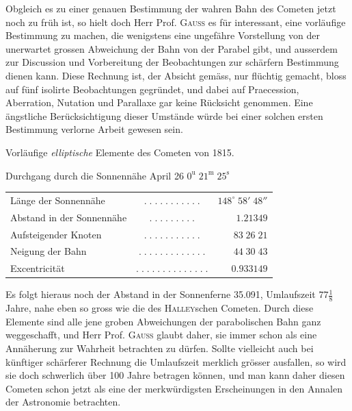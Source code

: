 \par\indent Obgleich es zu einer genauen Bestimmung der wahren Bahn des Cometen jetzt noch zu früh ist, so
hielt doch Herr Prof. \textsc{Gauss} es für interessant, eine vorläufige Bestimmung zu machen, die
wenigstens eine ungefähre Vorstellung von der unerwartet grossen Abweichung der Bahn von der
Parabel gibt, und ausserdem zur Discussion und Vorbereitung der Beobachtungen zur schärfern
Bestimmung dienen kann. Diese Rechnung ist, der Absicht gemäss, nur flüchtig gemacht, bloss auf
fünf isolirte Beobachtungen gegründet, und dabei auf Praecession, Aberration, Nutation und
Parallaxe gar keine Rücksicht genommen. Eine ängstliche Berücksichtigung dieser Umstände würde
bei einer solchen ersten Bestimmung verlorne Arbeit gewesen sein.

\begin{center}
Vorläufige \emph{elliptische} Elemente des Cometen von 1815.
\end{center}

\begin{center}\fontsize{10}{12}\selectfont Durchgang durch die Sonnennähe April 26 $0^{\mathrm u}\;21^{\mathrm m}\;25^{\mathrm s}$\end{center}
\begin{center}\fontsize{10}{12}\selectfont\setlength{\tabcolsep}{3pt}\renewcommand{\arraystretch}{1.15}\begin{tabular}{lcr}
Länge der Sonnennähe & $.\;.\;.\;.\;.\;.\;.\;.\;.\;.\;.$ & $148^\circ\;58'\;48''$\\
Abstand in der Sonnennähe & $.\;.\;.\;.\;.\;.\;.\;.\;.$ & $1.21349$\\
Aufsteigender Knoten & $.\;.\;.\;.\;.\;.\;.\;.\;.\;.\;.$ & $83\;26\;21$\\
Neigung der Bahn & $.\;.\;.\;.\;.\;.\;.\;.\;.\;.\;.\;.\;.$ & $44\;30\;43$\\
Excentricität & $.\;.\;.\;.\;.\;.\;.\;.\;.\;.\;.\;.\;.\;.$ & $0.933149$\\
\end{tabular}\end{center}

\par\indent Es folgt hieraus noch der Abstand in der Sonnenferne 35.091, Umlaufszeit $77\frac{1}{8}$ Jahre,
nahe eben so gross wie die des \textsc{Halley}schen Cometen. Durch diese Elemente sind alle jene groben
Abweichungen der parabolischen Bahn ganz weggeschafft, und Herr Prof. \textsc{Gauss} glaubt daher, sie
immer schon als eine Annäherung zur Wahrheit betrachten zu dürfen. Sollte vielleicht auch bei
künftiger schärferer Rechnung die Umlaufszeit merklich grösser ausfallen, so wird sie doch
schwerlich über 100 Jahre betragen können, und man kann daher diesen Cometen schon jetzt als eine
der merkwürdigsten Erscheinungen in den Annalen der Astronomie betrachten.
